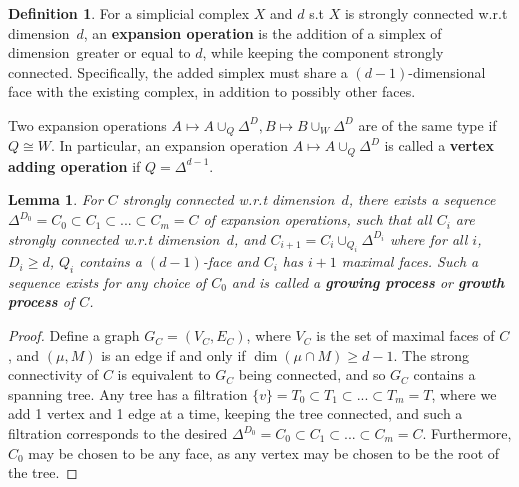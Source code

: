 \documentclass{article}
\theoremstyle{plain}
\newtheorem{lemma}[theorem]{Lemma}
\theoremstyle{definition}
\newtheorem{definition}[theorem]{Definition}
\theoremstyle{remark}
\newcommand{\di}{dimension}
\begin{document}
\begin{definition}\label{expansionOp}
    For a simplicial complex $X$ and $d$ s.t $X$ is strongly connected w.r.t \di \ $d$, an \textbf{expansion operation} is the addition of a simplex of \di \ greater or equal to $d$, while keeping the component strongly connected.
    Specifically, the added simplex must share a $(d-1)$-dimensional face with the existing complex, in addition to possibly other faces.\par
    Two expansion operations $A\mapsto A\cup_Q \Delta^D, B\mapsto B\cup_W \Delta^D$ are of the same type if $Q\cong W$. 
    In particular, an expansion operation $A\mapsto A\cup_Q \Delta^D$ is called a \textbf{vertex adding operation} if $Q=\Delta^{d-1}$.
    
\end{definition} 

\begin{lemma}\label{vertBeforeAles}
     For $C$ strongly connected w.r.t \di\ $d$, there exists a sequence $\Delta^{D_0}=C_0\subset C_1\subset...\subset C_m=C$ of expansion operations, such that all $C_i$ are strongly connected w.r.t \di\ $d$, and $C_{i+1}=C_i\cup_{Q_i} \Delta^{D_i}$ where for all $i$, $D_i\ge d$, $Q_i$ contains a $(d-1)$-face and $C_i$ has $i+1$ maximal faces.
    Such a sequence exists for any choice of $C_0$ and is called a \textbf{growing process} or \textbf{growth process} of $C$.
\end{lemma}
\begin{proof}
 Define a graph $G_C=(V_C,E_C)$, where $V_C$ is the set of maximal faces of $C$, and $(\mu,M)$ is an edge if and only if $\dim(\mu\cap M)\ge d-1$. 
    The strong connectivity of $C$ is equivalent to $G_C$ being connected, and so $G_C$ contains a spanning tree.
    Any tree has a filtration $\{v\}=T_0\subset T_1\subset ...\subset T_m=T$, where we add 1 vertex and 1 edge at a time, keeping the tree connected, and such a filtration corresponds to the desired $\Delta^{D_0}=C_0\subset C_1\subset...\subset C_m=C$. Furthermore, $C_0$ may be chosen to be any face, as any vertex may be chosen to be the root of the tree.
\end{proof}
\end{document}
